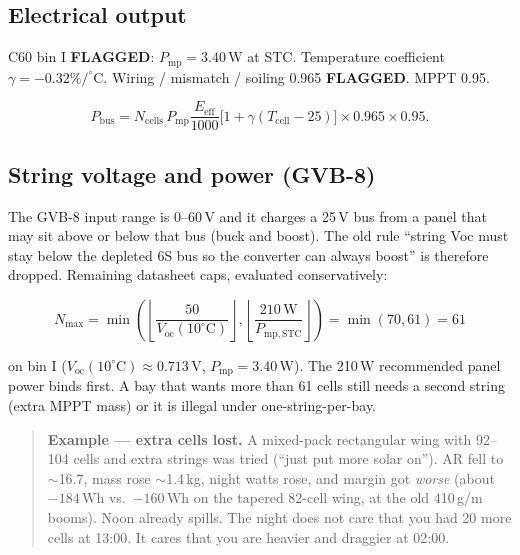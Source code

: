 \documentclass[11pt,letterpaper]{article}
\newcommand{\flag}{\textcolor{red!60!black}{\textbf{FLAGGED}}}
\newenvironment{examplebox}{\begin{quote}\small}{\end{quote}}
\begin{document}
\subsection{Electrical output}

C60 bin I \flag{}: $P_\mathrm{mp} = 3.40\,\mathrm{W}$ at STC. Temperature coefficient $\gamma = -0.32\%/^\circ\mathrm{C}$. Wiring / mismatch / soiling 0.965 \flag{}. MPPT 0.95.

\begin{equation}
  P_\mathrm{bus}
    = N_\mathrm{cells}\, P_\mathrm{mp}
      \frac{E_\mathrm{eff}}{1000}
      \bigl[1 + \gamma (T_\mathrm{cell}-25)\bigr]
      \times 0.965 \times 0.95.
\end{equation}

\subsection{String voltage and power (GVB-8)}

The GVB-8 input range is $0$--$60\,\mathrm{V}$ and it charges a 25\,V bus from a panel that may sit above or below that bus (buck and boost). The old rule ``string Voc must stay below the depleted 6S bus so the converter can always boost'' is therefore dropped. Remaining datasheet caps, evaluated conservatively:

\begin{equation}
  N_{\max} = \min\left(
    \left\lfloor \frac{50}{V_\mathrm{oc}(10^\circ\mathrm{C})} \right\rfloor,
    \left\lfloor \frac{210\,\mathrm{W}}{P_\mathrm{mp,STC}} \right\rfloor
  \right)
  = \min(70, 61) = 61
\end{equation}

on bin I ($V_\mathrm{oc}(10^\circ\mathrm{C})\approx 0.713\,\mathrm{V}$, $P_\mathrm{mp}=3.40\,\mathrm{W}$). The 210\,W recommended panel power binds first. A bay that wants more than 61 cells still needs a second string (extra MPPT mass) or it is illegal under one-string-per-bay.

\begin{examplebox}
\textbf{Example --- extra cells lost.} A mixed-pack rectangular wing with 92--104 cells and extra strings was tried (``just put more solar on''). AR fell to $\sim$16.7, mass rose $\sim$1.4\,kg, night watts rose, and margin got \emph{worse} (about $-184\,\mathrm{Wh}$ vs.\ $-160\,\mathrm{Wh}$ on the tapered 82-cell wing, at the old 410\,g/m booms). Noon already spills. The night does not care that you had 20 more cells at 13:00. It cares that you are heavier and draggier at 02:00.
\end{examplebox}
\end{document}
